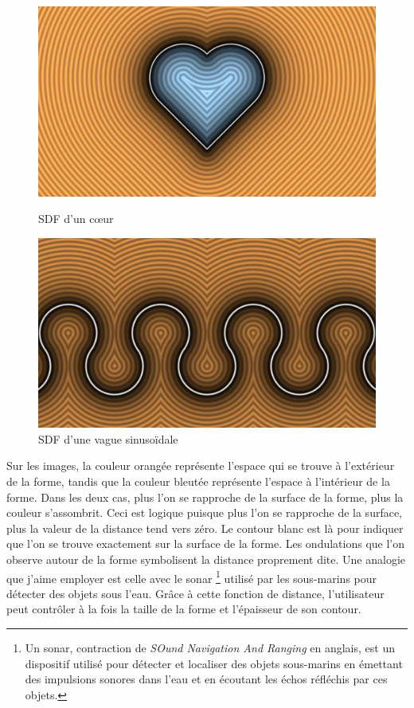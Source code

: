 \begin{figure}[h]
  \begin{minipage}[b]{0.45\linewidth}
    \centering
    \includegraphics[width=\linewidth]{images/sdf/sdf_02.jpg}
    \caption{SDF d'un cœur}
    \label{sdf_02}
  \end{minipage}
  \hspace{0.1\linewidth} %
  \begin{minipage}[b]{0.45\linewidth}
    \centering
    \includegraphics[width=\linewidth]{images/sdf/sdf_03.jpg}
    \caption{SDF d'une vague sinusoïdale}
    \label{sdf_03}
  \end{minipage}
\end{figure}

Sur les images, la couleur orangée représente l'espace qui se trouve à l'extérieur de la forme, tandis que la couleur bleutée représente l'espace à l'intérieur de la forme. Dans les deux cas, plus l'on se rapproche de la surface de la forme, plus la couleur s'assombrit. Ceci est logique puisque plus l'on se rapproche de la surface, plus la valeur de la distance tend vers zéro. Le contour blanc est là pour indiquer que l'on se trouve exactement sur la surface de la forme. Les ondulations que l'on observe autour de la forme symbolisent la distance proprement dite. Une analogie que j'aime employer est celle avec le sonar \footnote{Un sonar, contraction de \textit{SOund Navigation And Ranging} en anglais, est un dispositif utilisé pour détecter et localiser des objets sous-marins en émettant des impulsions sonores dans l'eau et en écoutant les échos réfléchis par ces objets.} utilisé par les sous-marins pour détecter des objets sous l'eau. Grâce à cette fonction de distance, l'utilisateur peut contrôler à la fois la taille de la forme et l'épaisseur de son contour.

